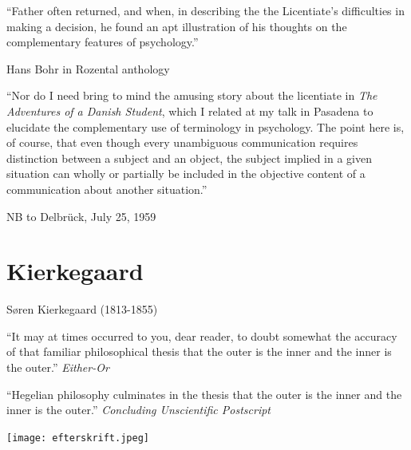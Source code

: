 \documentclass[ignorenonframetext, ]{beamer}
\begin{document}
\begin{frame}

  ``Father often returned, and when, in describing the the
  Licentiate's difficulties in making a decision, he found an apt
  illustration of his thoughts on the complementary features of
  psychology.''

  \medskip Hans Bohr in Rozental anthology

\end{frame}

\begin{frame}

    ``Nor do I need bring to mind the amusing story about the
    licentiate in \emph{The Adventures of a Danish Student}, which I
    related at my talk in Pasadena to elucidate the complementary use
    of terminology in psychology. The point here is, of course, that
    even though every unambiguous communication requires distinction
    between a subject and an object, the subject implied in a given
    situation can wholly or partially be included in the objective
    content of a communication about another situation.''

    \medskip NB to Delbr{\"u}ck, July 25, 1959

\end{frame}

\section{Kierkegaard}

\begin{frame}{Søren Kierkegaard (1813-1855)}

  ``It may at times occurred to you, dear reader, to doubt somewhat
  the accuracy of that familiar philosophical thesis that the outer is
  the inner and the inner is the outer.'' \newline \emph{Either-Or}

  \vfill ``Hegelian philosophy culminates in the thesis that the outer
  is the inner and the inner is the outer.'' \newline \emph{Concluding
    Unscientific Postscript}


\end{frame}



\begin{frame}

  \texttt{[image: efterskrift.jpeg]}


\end{frame}
\end{document}
